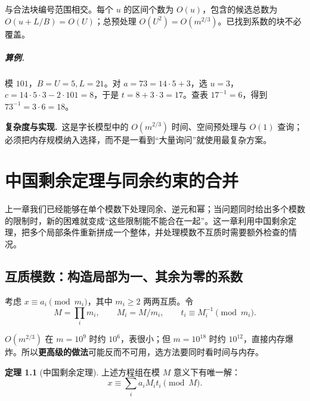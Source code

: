 \documentclass[UTF8,a4paper,11pt,twoside,openright,fontset=fandol]{ctexbook}
\theoremstyle{definition}
\newtheorem{theorem}[definition]{定理}
\newcommand{\cost}{\par\noindent\textbf{复杂度与实现.}\ }
\begin{document}
与合法块编号范围相交。每个 $u$ 的区间个数为 $O(u)$，包含的候选总数为 $O(u+L/B)=O(U)$；总预处理 $O(U^2)=O(m^{2/3})$。已找到系数的块不必覆盖。

\paragraph{算例.} 模 $101$，$B=U=5,L=21$。对 $a=73=14\cdot5+3$，选 $u=3$，$c=14\cdot5\cdot3-2\cdot101=8$，于是 $t=8+3\cdot3=17$。查表 $17^{-1}=6$，得到 $73^{-1}=3\cdot6=18$。
\cost 这是字长模型中的 $O(m^{2/3})$ 时间、空间预处理与 $O(1)$ 查询；必须把内存规模纳入选择，而不是一看到“大量询问”就使用最复杂方案。



\chapter{中国剩余定理与同余约束的合并}
\begin{chapterintro}[章节导读]
上一章我们已经能够在单个模数下处理同余、逆元和幂；当问题同时给出多个模数的限制时，新的困难就变成“这些限制能不能合在一起”。这一章利用中国剩余定理，把多个局部条件重新拼成一个整体，并处理模数不互质时需要额外检查的情况。
\end{chapterintro}

\section{互质模数：构造局部为一、其余为零的系数}
考虑 $x\equiv a_i\pmod{m_i}$，其中 $m_i\ge2$ 两两互质。令
\[
 M=\prod_i m_i,\qquad M_i=M/m_i,\qquad t_i\equiv M_i^{-1}\pmod{m_i}.
\]

\begin{tip}
$O(m^{2/3})$ 在 $m=10^9$ 时约 $10^6$，表很小；但 $m=10^{18}$ 时约 $10^{12}$，直接内存爆炸。所以\textbf{更高级的做法}可能反而不可用，选方法要同时看时间与内存。
\end{tip}

\begin{theorem}[中国剩余定理]
上述方程组在模 $M$ 意义下有唯一解：
\[
 x\equiv\sum_i a_iM_it_i\pmod M.
\]
\end{theorem}
\end{document}
